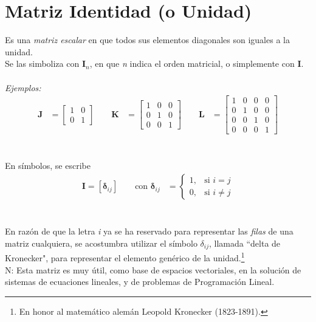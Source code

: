 \documentclass[a4paper,12pt]{report} %
\begin{document}
\section{Matriz Identidad (o Unidad)}
Es una \textit{matriz escalar} en que todos sus elementos diagonales son iguales a la unidad.\\
Se las simboliza con \(\mathbf{I}_\mathit{n}\), en que \textit{n} indica el orden matricial, o simplemente con \textbf{I}. \\ \\
\textit{Ejemplos:} \\
\[
\begin{aligned}
\mathbf{J} &= \begin{bmatrix}
    1 & 0 \\
    0 & 1
\end{bmatrix}
\qquad
\mathbf{K} &= \begin{bmatrix}
    1  & 0 & 0 \\
    0 & 1 & 0 \\
    0 & 0 & 1
\end{bmatrix}
\qquad
\mathbf{L} &= \begin{bmatrix}
    1 & 0 & 0 & 0\\
    0 & 1 & 0 & 0\\
    0 & 0 & 1 & 0\\
    0 & 0 & 0 & 1
\end{bmatrix}
\end{aligned}
\]
\\ \\
En símbolos, se escribe
\[
\begin{aligned}
    \mathbf{I} = \left[\mathit{\mathbf{\delta}_{ij}}\right]
    \qquad
    \text{con } \mathbf{\delta}_{ij} &= \begin{cases}
        1, & \text{si } \mathit{i = j} \\
        0, & \text{si } \mathit{i\neq j}
    \end{cases}
\end{aligned}
\]
\\ \\
En razón de que la letra \textit{i} ya se ha reservado para representar las \textit{filas} de una matriz cualquiera, se acostumbra utilizar el símbolo \(\delta_{ij}\), llamada ``delta de Kronecker", para representar el elemento genérico de la unidad.\footnote{En honor al matemático alemán Leopold Kronecker (1823-1891).}\\
N: Esta matriz es muy útil, como base de espacios vectoriales, en la solución de sistemas de ecuaciones lineales, y de problemas de Programación Lineal.
\\ 
\end{document}
